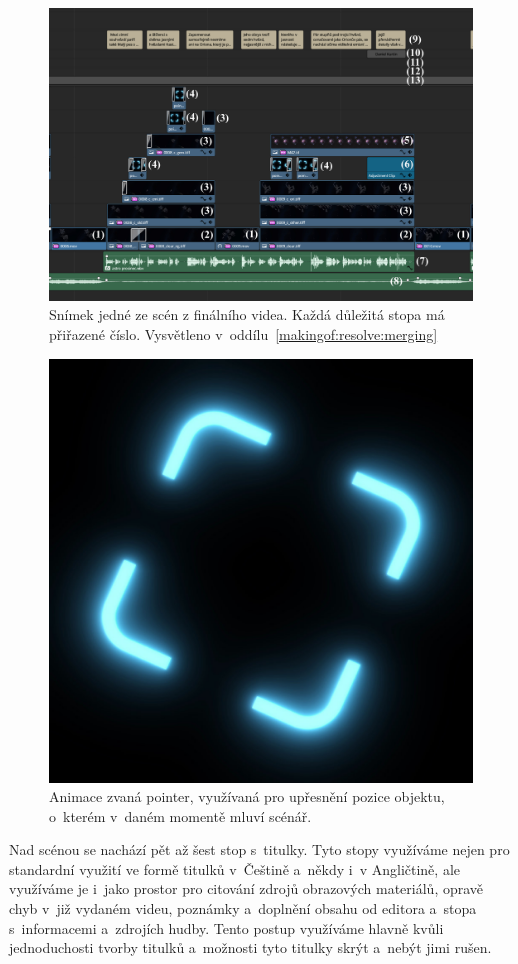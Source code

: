 \documentclass[12pt,a4paper,titlepage]{article}
\begin{document}
\begin{figure}[H]
	\centering
	\includegraphics[width=1\textwidth]{timeline_annotated.eps}
	\caption{Snímek jedné ze scén z finálního videa. Každá důležitá stopa má přiřazené číslo. Vysvětleno v~oddílu~\ref{makingof:resolve:merging}}\label{img:timeline}
\end{figure}

\begin{figure}[H]
	\centering
	\includegraphics[width=.5\textwidth]{pointer.eps}
	\caption{Animace zvaná pointer, využívaná pro upřesnění pozice objektu, o~kterém v~daném momentě mluví scénář.}\label{img:pointer}
\end{figure}

Nad scénou se nachází pět až šest stop s~titulky. Tyto stopy využíváme nejen pro standardní využití ve formě titulků v~Češtině a~někdy i~v Angličtině, ale využíváme je i~jako prostor pro citování zdrojů obrazových materiálů, opravě chyb v~již vydaném videu, poznámky a~doplnění obsahu od editora a~stopa s~informacemi a~zdrojích hudby. Tento postup využíváme hlavně kvůli jednoduchosti tvorby titulků a~možnosti tyto titulky skrýt a~nebýt jimi rušen. 
\end{document}
